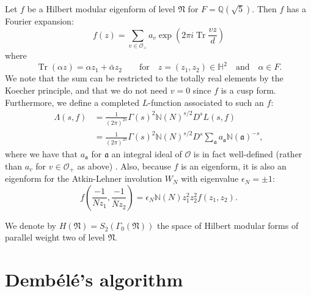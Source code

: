 \documentclass{article}
\DeclareMathOperator{\Tr}{Tr}
\theoremstyle{plain}
\begin{document}
Let $f$ be a Hilbert modular eigenform of level $\mathfrak{N}$ for $F=\mathbb{Q}(\sqrt{5})$. Then $f$ has a Fourier expansion:
\begin{equation*}
f(z)=\sum_{v \in \mathcal{O}_+} a_v \exp\left(2\pi i\Tr \frac{v z}{d}\right)
\end{equation*}
where
\begin{equation*}
\Tr(\alpha z) = \alpha z_1 + \bar{\alpha}z_2 \qquad \text{for} \quad z=(z_1, z_2) \in \mathbb{H}^2 \quad \text{and} \quad \alpha \in F.
\end{equation*}
We note that the sum can be restricted to the totally real elements by the Koecher principle, and that we do not need $v=0$ since $f$ is a cusp form. Furthermore, we define a completed $L$-function associated to such an $f$:
\begin{align*}
\Lambda(s,f) & = \frac{1}{(2\pi)^{2s}} \Gamma(s)^2 \mathbb{N}(N)^{s/2} D^s L(s,f)\\
&= \frac{1}{(2\pi)^{2s}} \Gamma(s)^2 \mathbb{N}(N)^{s/2} D^s \sum_{\mathfrak{a}}a_{\mathfrak{a}}\mathbb{N}(\mathfrak{a})^{-s},
\end{align*}
where we have that $a_{\mathfrak{a}}$ for $\mathfrak{a}$ an integral ideal of $\mathcal{O}$ is in fact well-defined (rather than $a_v$ for $v \in \mathcal{O}_+$ as above) \cite[Section 1.7]{bump}.
Also, because $f$ is an eigenform, it is also an eigenform for the Atkin-Lehner involution $W_N$ with eigenvalue $\epsilon_N= \pm 1$:
\begin{equation*}
f\left(\frac{-1}{Nz_1},\frac{-1}{\bar{N}z_2} \right)=\epsilon_N \mathbb{N}(N)z_1^2z_2^2f(z_1, z_2).
\end{equation*}

We denote by $H(\mathfrak{N}) = S_{\bar{2}}(\Gamma_0(\mathfrak{N}))$  the space of Hilbert modular forms of parallel weight two of level $\mathfrak{N}$.

\section{Demb\'{e}l\'{e}'s algorithm}
\end{document}

